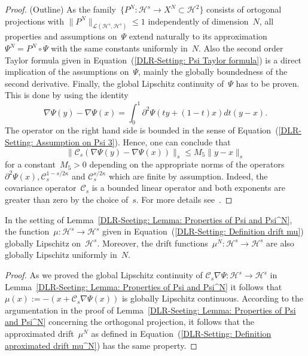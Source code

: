 \begin{proof}\autocite{Mattingly2010}(Outline)
 As the family~$\{ P^N: \mathcal{H}^s \to X^N \subset \mathcal{H}^2 \}$ consists of ortogonal projections with $\| P^N \|_{\mathcal{L}(\mathcal{H}^s, \mathcal{H}^s)} \leq 1$ independently of dimension~$N$, all properties and assumptions on~$\Psi$ extend naturally to its approximation~$\Psi^N = P^N \circ \Psi$ with the same constants uniformly in~$N$. Also the second order Taylor formula given in Equation~(\ref{DLR-Setting: Psi Taylor formula}) is a direct implication of the assumptions on~$\Psi$, mainly the globally boundedness of the second derivative.  Finally, the global Lipschitz continuity of~$\Psi$ has to be proven. This is done by using the identity
 \begin{equation*}
  \nabla \Psi (y) - \nabla \Psi(x) = \int_0^1 \partial^2 \Psi (ty + (1-t)x) dt (y-x).
 \end{equation*}
 The operator on the right hand side is bounded in the sense of Equation~(\ref{DLR-Setting: Assumption on Psi 3}). Hence, one can conclude that
 \begin{equation*}
  \| \mathcal{C}_s \left( \nabla \Psi(y) - \nabla \Psi(x) \right) \|_s \leq M_5 \| y-x\|_s
 \end{equation*}
 for a constant~$M_5>0$ depending on the appropriate norms of the operators~$\partial^2 \Psi(x), \mathcal{C}_s^{1-s/2\kappa}$ and $\mathcal{C}_s^{s/2\kappa}$ which are finite by assumption. Indeed, the covariance operator~$\mathcal{C}_s$ is a bounded linear operator and both exponents are greater than zero by the choice of~$s$. For more details see~\autocite[Lemma 3.3]{Mattingly2010}.
  
\end{proof}

\begin{cor}\autocite[Remark 2.5]{Pillai2012}
\label{DLR-Setting: Corollary: drifts are Lipschitz}
In the setting of Lemma~\ref{DLR-Seeting: Lemma: Properties of Psi and Psi^N}, the function~$\mu : \mathcal{H}^s \to \mathcal{H}^s$ given in Equation~(\ref{DLR-Setting: Definition drift mu}) globally Lipschitz on~$\mathcal{H}^s$. Moreover, the drift functions~$\mu^N : \mathcal{H}^s \to \mathcal{H}^s$ are also globally Lipschitz uniformly in~$N$.
 
\end{cor}

\begin{proof}
 As we proved the global Lipschitz continuity of $\mathcal{C}_s\nabla \Psi: \mathcal{H}^s \to \mathcal{H}^s$ in Lemma~\ref{DLR-Seeting: Lemma: Properties of Psi and Psi^N} it follows that $\mu(x) := - (x + \mathcal{C}_s \nabla \Psi (x) )$ is globally Lipschitz continuous. According to the argumentation in the proof of Lemma~\ref{DLR-Seeting: Lemma: Properties of Psi and Psi^N} concerning the orthogonal projection, it follows that the approximated drift~$\mu^N$ as defined in Equation~(\ref{DLR-Setting: Definition aproximated drift mu^N}) has the same property.
\end{proof}


